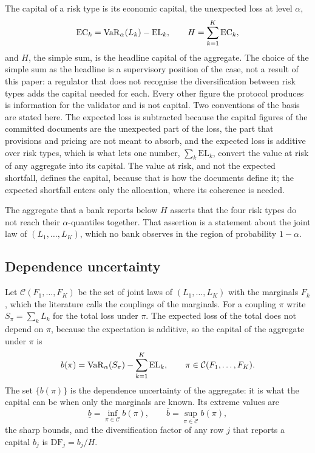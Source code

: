 The capital of a risk type is its economic capital, the unexpected loss at level $\alpha$,
\begin{equation}
\mathrm{EC}_k=\operatorname{VaR}_\alpha(L_k)-\mathrm{EL}_k ,\qquad H=\sum_{k=1}^K \mathrm{EC}_k ,
\label{eq:ec-headline}
\end{equation}
and $H$, the simple sum, is the headline capital of the aggregate. The choice of the simple sum as the headline is a supervisory
position of the case, not a result of this paper: a regulator that does not recognise the diversification between risk types adds
the capital needed for each. Every other figure the protocol produces is information for the validator and is not capital. Two conventions of the basis are
stated here. The expected loss is subtracted because the capital figures of the committed documents are the unexpected part of the
loss, the part that provisions and pricing are not meant to absorb, and the expected loss is additive over risk types, which is
what lets one number, $\sum_k\mathrm{EL}_k$, convert the value at risk of any aggregate into its capital. The value at risk, and
not the expected shortfall, defines the capital, because that is how the documents define it; the expected shortfall enters only
the allocation, where its coherence is needed.

The aggregate that a bank reports below $H$ asserts that the four risk types do not reach their $\alpha$-quantiles together. That
assertion is a statement about the joint law of $(L_1,\dots,L_K)$, which no bank observes in the region of probability $1-\alpha$.

\subsection{Dependence uncertainty}
\label{sec:problem-uncertainty}

Let $\mathcal C(F_1,\dots,F_K)$ be the set of joint laws of $(L_1,\dots,L_K)$ with the marginals $F_k$, which the literature calls the
couplings of the marginals. For a coupling $\pi$ write $S_\pi=\sum_k L_k$ for the total loss under $\pi$. The expected loss of
the total does not depend on $\pi$, because the expectation is additive, so the capital of the aggregate under $\pi$ is
\begin{equation}
b(\pi)=\operatorname{VaR}_\alpha(S_\pi)-\sum_{k=1}^K \mathrm{EL}_k ,\qquad \pi\in\mathcal C(F_1,\dots,F_K).
\label{eq:coupling-capital}
\end{equation}
The set $\{b(\pi)\}$ is the dependence uncertainty of the aggregate: it is what the capital can be when only the marginals are
known. Its extreme values are
\begin{equation}
\underline b=\inf_{\pi\in\mathcal C} b(\pi),\qquad \overline b=\sup_{\pi\in\mathcal C} b(\pi),
\label{eq:sharp-bounds}
\end{equation}
the sharp bounds, and the diversification factor of any row $j$ that reports a capital $b_j$ is $\mathrm{DF}_j=b_j/H$.

